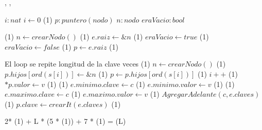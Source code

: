 {   ,
    ,
    }
{}{}
{
    \var $i : nat$
    \State $ i \gets 0$                                                 \comment \bigo(1)
    \var $p : puntero(nodo)$
    \var $n : nodo$
    \var $eraVacio : bool$

                                                   \comment \bigo(1)
        \State $n \gets crearNodo()$                                    \comment \bigo(1)
        \State $e.raiz \gets \&n$                                       \comment \bigo(1)
        \State $eraVacio \gets true$                                    \comment \bigo(1)
    \Else
        \State $eraVacio \gets false$                                   \comment \bigo(1)
    \EndIf
    \State $ p \gets e.raiz$                                            \comment \bigo(1)

        \Statex             \comment El loop se repite longitud de la clave veces
                                       \comment \bigo(1)
            \State $n \gets crearNodo()$                                \comment \bigo(1)
            \State $p.hijos[ord(s[i])] \gets \&n$                       \comment \bigo(1)
        \EndIf
        \State $p \gets p.hijos[ord(s[i])]$                             \comment \bigo(1)
        \State $i++$                                                    \comment \bigo(1)
    \EndWhile
        \State $*p.valor \gets v$                                       \comment \bigo(1)
                                 \comment \bigo(1)
        \State $e.minimo.clave \gets c$                                 \comment \bigo(1)
        \State $e.minimo.valor \gets v$                                 \comment \bigo(1)
    \EndIf
                                 \comment \bigo(1)
        \State $e.maximo.clave \gets c$                                 \comment \bigo(1)
        \State $e.maximo.valor \gets v$                                 \comment \bigo(1)
    \EndIf
    \State $AgregarAdelante(c, e.claves)$                               \comment \bigo(1)
    \State $p.clave \gets crearIt(e.claves)$                            \comment \bigo(1)

}    {  2* \bigo(1) + L * (5 * \bigo(1)) + 7 * \bigo(1) = \bigo(L) }

